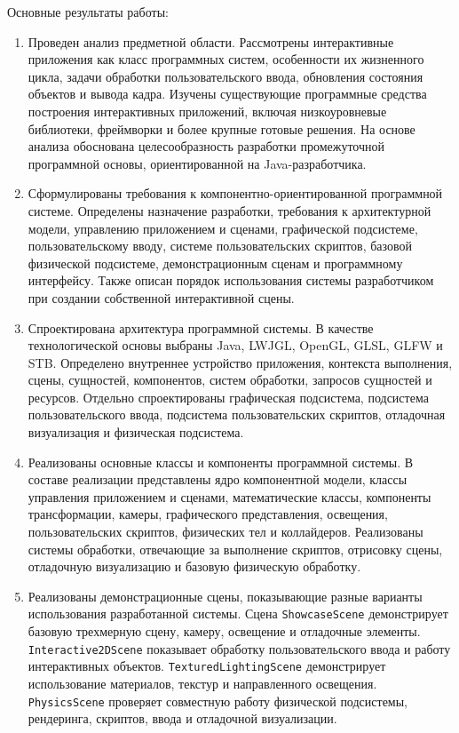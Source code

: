 Основные результаты работы:
\begin{enumerate}
\item Проведен анализ предметной области. Рассмотрены интерактивные приложения
как класс программных систем, особенности их жизненного цикла, задачи
обработки пользовательского ввода, обновления состояния объектов и вывода
кадра. Изучены существующие программные средства построения интерактивных
приложений, включая низкоуровневые библиотеки, фреймворки и более крупные
готовые решения. На основе анализа обоснована целесообразность разработки
промежуточной программной основы, ориентированной на Java-разработчика.

\item Сформулированы требования к компонентно-ориентированной программной
системе. Определены назначение разработки, требования к архитектурной модели,
управлению приложением и сценами, графической подсистеме, пользовательскому
вводу, системе пользовательских скриптов, базовой физической подсистеме,
демонстрационным сценам и программному интерфейсу. Также описан порядок
использования системы разработчиком при создании собственной интерактивной
сцены.

\item Спроектирована архитектура программной системы. В качестве технологической
основы выбраны Java, LWJGL, OpenGL, GLSL, GLFW и STB. Определено внутреннее
устройство приложения, контекста выполнения, сцены, сущностей, компонентов,
систем обработки, запросов сущностей и ресурсов. Отдельно спроектированы
графическая подсистема, подсистема пользовательского ввода, подсистема
пользовательских скриптов, отладочная визуализация и физическая подсистема.

\item Реализованы основные классы и компоненты программной системы. В составе
реализации представлены ядро компонентной модели, классы управления
приложением и сценами, математические классы, компоненты трансформации,
камеры, графического представления, освещения, пользовательских скриптов,
физических тел и коллайдеров. Реализованы системы обработки, отвечающие за
выполнение скриптов, отрисовку сцены, отладочную визуализацию и базовую
физическую обработку.

\item Реализованы демонстрационные сцены, показывающие разные варианты
использования разработанной системы. Сцена \texttt{ShowcaseScene} демонстрирует
базовую трехмерную сцену, камеру, освещение и отладочные элементы.
\texttt{Interactive2DScene} показывает обработку пользовательского ввода и
работу интерактивных объектов. \texttt{TexturedLightingScene} демонстрирует
использование материалов, текстур и направленного освещения.
\texttt{PhysicsScene} проверяет совместную работу физической подсистемы,
рендеринга, скриптов, ввода и отладочной визуализации.


\end{enumerate}
